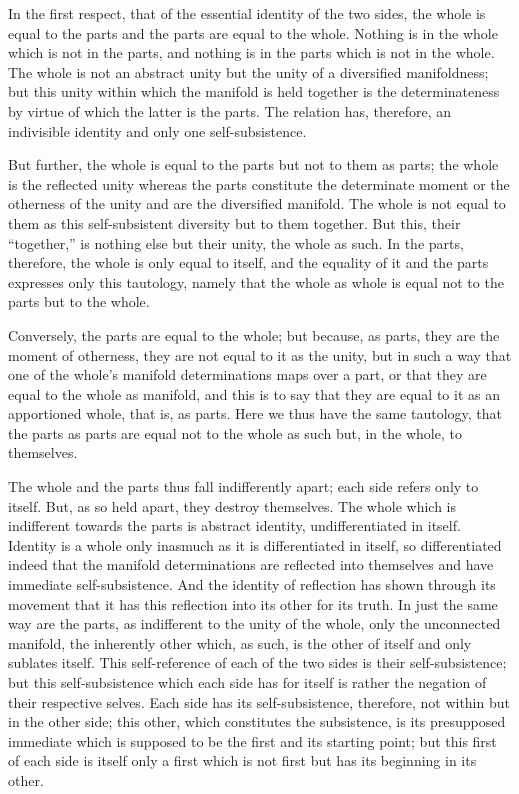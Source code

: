 In the first respect, that of
the essential identity of the two sides,
the whole is equal to the parts
and the parts are equal to the whole.
Nothing is in the whole which is not in the parts,
and nothing is in the parts which is not in the whole.
The whole is not an abstract unity
but the unity of a diversified manifoldness;
but this unity within which the manifold is
held together is the determinateness
by virtue of which the latter is the parts.
The relation has, therefore, an indivisible identity
and only one self-subsistence.

But further, the whole is equal to the parts
but not to them as parts;
the whole is the reflected unity
whereas the parts constitute
the determinate moment
or the otherness of the unity
and are the diversified manifold.
The whole is not equal to them
as this self-subsistent diversity
but to them together.
But this, their “together,” is
nothing else but their unity,
the whole as such.
In the parts, therefore, the whole
is only equal to itself,
and the equality of it and the parts expresses
only this tautology,
namely that the whole as whole is equal
not to the parts but to the whole.

Conversely, the parts are equal to the whole;
but because, as parts,
they are the moment of otherness,
they are not equal to it as the unity,
but in such a way that one of the whole's
manifold determinations maps over a part,
or that they are equal to the whole as manifold,
and this is to say that they are equal to it
as an apportioned whole, that is, as parts.
Here we thus have the same tautology,
that the parts as parts are equal
not to the whole as such
but, in the whole, to themselves.

The whole and the parts thus
fall indifferently apart;
each side refers only to itself.
But, as so held apart, they destroy themselves.
The whole which is indifferent towards the parts is
abstract identity, undifferentiated in itself.
Identity is a whole only inasmuch
as it is differentiated in itself,
so differentiated indeed that the manifold
determinations are reflected into themselves
and have immediate self-subsistence.
And the identity of reflection has
shown through its movement
that it has this reflection
into its other for its truth.
In just the same way are the parts,
as indifferent to the unity of the whole,
only the unconnected manifold,
the inherently other which, as such,
is the other of itself and only sublates itself.
This self-reference of each of the two sides
is their self-subsistence;
but this self-subsistence which
each side has for itself is rather
the negation of their respective selves.
Each side has its self-subsistence, therefore,
not within but in the other side;
this other, which constitutes the subsistence,
is its presupposed immediate which is supposed
to be the first and its starting point;
but this first of each side is itself
only a first which is not first
but has its beginning in its other.


